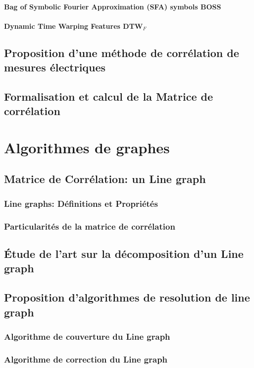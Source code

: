 \documentclass[onecolumn, 12pt]{book}
\begin{document}
			\subsubsection{Bag of Symbolic Fourier Approximation (SFA) symbols BOSS}
			\subsubsection{Dynamic Time Warping Features DTW$_{F}$}
	\section{Proposition d'une m\'ethode de corr\'elation de mesures \'electriques}
	\section{Formalisation et calcul de la Matrice de corr\'elation}
\chapter{Algorithmes de graphes}
	\section{Matrice de Corr\'elation: un Line graph}
		\subsection{Line graphs: D\'efinitions et Propri\'et\'es}
		\subsection{Particularit\'es de la matrice de corr\'elation}
	\section{\'Etude de l'art sur la d\'ecomposition d'un Line graph}
	\section{Proposition d'algorithmes de resolution de line graph}
		\subsection{Algorithme de couverture du Line graph}
		\subsection{Algorithme de correction du Line graph}
\end{document}
